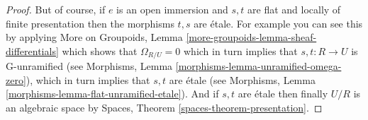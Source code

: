 \begin{proof}
\medskip\noindent
But of course, if $e$ is an open immersion and
$s, t$ are flat and locally of finite presentation
then the morphisms $t, s$ are \'etale.
For example you can see this by applying
More on Groupoids, Lemma \ref{more-groupoids-lemma-sheaf-differentials}
which shows that $\Omega_{R/U} = 0$ which in turn implies
that $s, t : R \to U$ is G-unramified (see
Morphisms, Lemma \ref{morphisms-lemma-unramified-omega-zero}),
which in turn implies that $s, t$ are \'etale (see
Morphisms, Lemma \ref{morphisms-lemma-flat-unramified-etale}).
And if $s, t$ are \'etale then finally $U/R$ is an algebraic
space by
Spaces, Theorem \ref{spaces-theorem-presentation}.
\end{proof}
